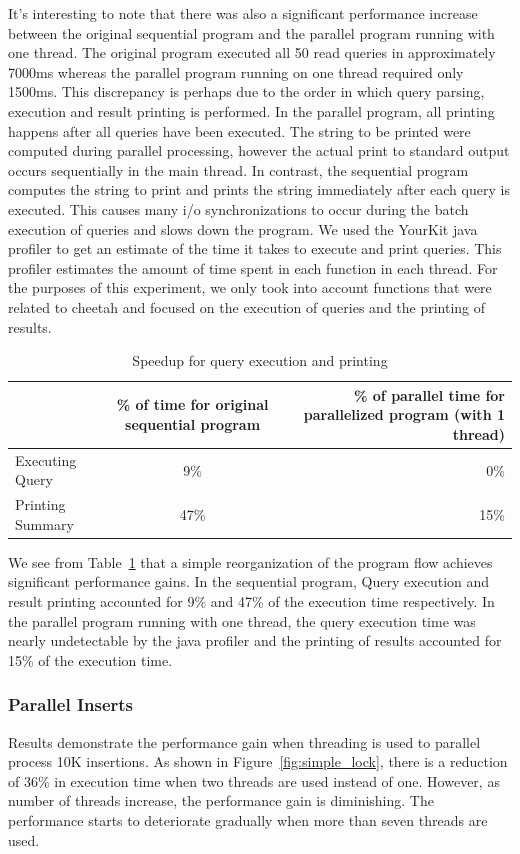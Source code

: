 \documentclass[11pt,journal,compsoc]{IEEEtran}
\begin{document}
It’s interesting to note that there was also a significant performance increase between the original sequential program and the parallel program running with one thread. The original program executed all 50 read queries in approximately 7000ms whereas the parallel program running on one thread required only 1500ms. This discrepancy is perhaps due to the order in which query parsing, execution and result printing is performed. In the parallel program, all printing happens after all queries have been executed. The string to be printed were computed during parallel processing, however the actual print to standard output occurs sequentially in the main thread. In contrast, the sequential program computes the string to print and prints the string immediately after each query is executed. This causes many i/o synchronizations to occur during the batch execution of queries and slows down the program. We used the YourKit java profiler to get an estimate of the time it takes to execute and print queries. This profiler estimates the amount of time spent in each function in each thread. For the purposes of this experiment, we only took into account functions that were related to cheetah and focused on the execution of queries and the printing of results.

\begin{table}
  \centering
  \begin{tabular}{ |l || c | r |}
    \hline
     & \% of time for original sequential program & \% of parallel time for parallelized program (with 1 thread) \\ \hline\hline
    Executing Query & 9\% & ~0\% \\ \hline
    Printing Summary & 47\% & 15\% \\
    \hline

  \end{tabular}
\caption{Speedup for query execution and printing}
\label{table:speedup}
\end{table}


We see from Table~\ref{table:speedup} that a simple reorganization of the program flow achieves significant performance gains. In the sequential program, Query execution and result printing accounted for 9\% and 47\% of the execution time respectively. In the parallel program running with one thread, the query execution time was nearly undetectable by the java profiler and the printing of results accounted for 15\% of the execution time. 


\subsubsection{Parallel Inserts}
Results demonstrate the performance gain when threading is used to parallel process 10K insertions. As shown in Figure~\ref{fig:simple_lock}, there is a reduction of 36\% in execution time when two threads are used instead of one. However, as number of threads increase, the performance gain is diminishing. The performance starts to deteriorate gradually when more than seven threads are used.
\end{document}
